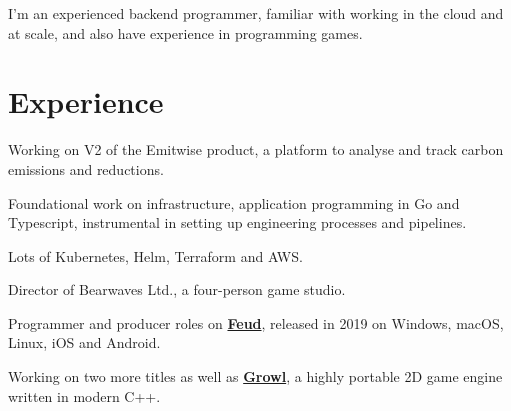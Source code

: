 \documentclass[]{deedy-resume-openfont}
\begin{document}
\begin{minipage}[t]{0.63\textwidth} 


\sectionsep
I'm an experienced backend programmer, familiar with working in the cloud and at scale, and also have experience in programming games.
\sectionsep

\section{Experience}

\begin{tightemize}
\item Working on V2 of the Emitwise product, a platform to analyse and track carbon emissions and reductions.
\item Foundational work on infrastructure, application programming in Go and Typescript, instrumental in setting up engineering processes and pipelines.
\item Lots of Kubernetes, Helm, Terraform and AWS.
\end{tightemize}
\sectionsep

\begin{tightemize}
\item Director of Bearwaves Ltd., a four-person game studio.
\item Programmer and producer roles on \href{https://store.steampowered.com/app/863400/Feud}{\bf{Feud}}, released in 2019 on Windows, macOS, Linux, iOS and Android.
\item Working on two more titles as well as \href{https://github.com/Bearwaves/growl}{\bf{Growl}}, a highly portable 2D game engine written in modern C++.
\end{tightemize}
\sectionsep


\end{minipage}
\end{document}
